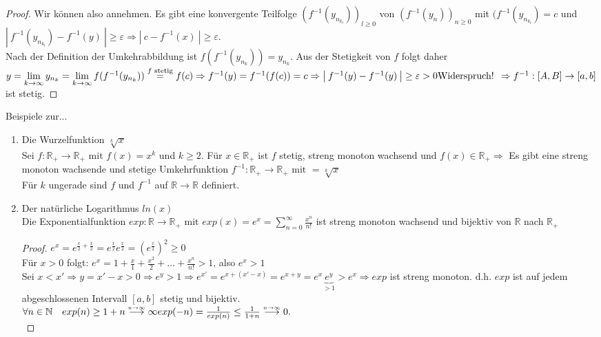 \documentclass[a4paper,titlepage,oneside]{article}
\def\N{\ensuremath{\mathbb{N}} }
\def\R{\ensuremath{\mathbb{R}} }
\renewcommand{\epsilon}{\ensuremath{\varepsilon} }
\def\WSP{\text{Widerspruch! }}
\newcommand{\suminf}[2][n]{\ensuremath{\sum_{#1= 0}^{\infty}{#2}}}
\renewcommand{\liminf}[2][n]{\ensuremath{\lim\limits_{#1 \rightarrow \infty}{#2}}}
\newcommand{\abs}[1]{\ensuremath{\left|\:#1\:\right|}}
\newcommand{\longtoinf}[1][n]{\ensuremath{\overset{\scriptscriptstyle{#1 \to \infty}}{\longrightarrow}}}
\theoremstyle{thmstyle}
\begin{document}
\begin{satz}
\begin{proof}
Wir können also annehmen. Es gibt eine konvergente Teilfolge $(f^{-1}(y_{n_{k_l}}))_{l \ge 0}$ von $(f^{-1}(y_n))_{n \ge 0}$ mit $(f^{-1}(y_{n_{k_l}}) = c$  und $\abs{f^{-1}(y_{n_{k_l}}) - f^{-1}(y)} \ge \epsilon \Rightarrow \abs{c - f^{-1}(x)} \ge \epsilon$. \\
 Nach der Definition der Umkehrabbildung ist $f(f^{-1}(y_{n_k})) = y_{n_k}$. Aus der Stetigkeit von $f$ folgt daher $y = \liminf[k]{y_{n_k}} = \liminf[k]{f(f^{-1}(y_{n_k}))}  \overset{f \text{ stetig}}{=} f(c)\\
 \Rightarrow f^{-1}(y) = f^{-1}(f(c)) = c
\Rightarrow \abs{f^{-1}(y) - f^{-1}(y)} \ge \epsilon > 0 \WSP \Rightarrow f^{-1}:[A,B] \to [a,b] $ ist stetig.
\end{proof}
\end{satz}

\begin{bsp}
Beispiele zur...
\begin{enumerate}
\item Die Wurzelfunktion $\sqrt[k]{x}$\\
Sei $f: \R_+ \to \R_+ \text{ mit } f(x) = x^k $ und $ k \ge 2$.
Für $x \in \R_+$ ist $f$ stetig, streng monoton wachsend und $f(x) \in \R_+ \Rightarrow $ Es gibt eine streng monoton wachsende und stetige Umkehrfunktion $f^{-1}: \R_+ \to \R_+ \text{ mit } = \sqrt[k]{x}$\\
Für $k$ ungerade sind $f$ und $f^{-1}$ auf $\R \to \R$ definiert.
\item Der natürliche Logarithmus $ln(x)$\\
Die Exponentialfunktion $exp: \R \to \R_+ \text{ mit } exp(x) = e^x = \suminf{\frac{x^n}{n!}}$ ist streng monoton wachsend und bijektiv von \R nach $\R_+$
\begin{proof}
	$e^x = e^{\frac{x}{2} + \frac{x}{2}} = e^{\frac{x}{2}} e^{\frac{x}{2}} = (e^{\frac{x}{2}})^2 \ge 0$\\
	Für $x > 0$ folgt: $e^x = 1 + \frac{x}{1} + \frac{x^2}{2} + \dots + \frac{x^n}{n!} > 1$, also $e^x > 1$\\
	Sei $x < x' \Rightarrow y = x' - x > 0 \Rightarrow e^y > 1 \Rightarrow e^{x'} = e^{x+(x'-x)} = e^{x+y} = e^x \underbrace{e^y}_{> 1} > e^x \Rightarrow exp$ ist streng monoton.
	d.h. $exp$ ist auf jedem abgeschlossenen Intervall $[a,b]$ stetig und bijektiv.\\
	$\forall n\in\N \quad 	exp(n)\ge 1 + n \longtoinf \infty \\
					exp(-n) = \frac{1}{exp(n)} \le \frac{1}{1+n} \longtoinf 0.$\\

\end{proof}
\end{enumerate}
\end{bsp}
\end{document}
